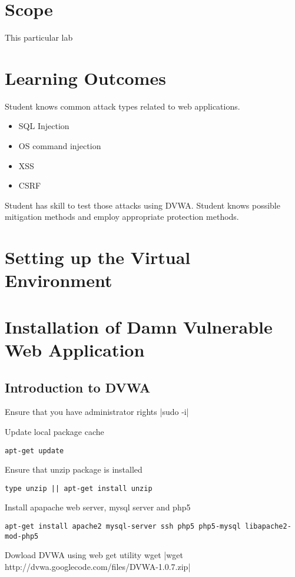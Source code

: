 \section{Scope}
This particular lab 
\section{Learning Outcomes}
Student knows common attack types related to web applications.
\begin{itemize}
	\item SQL Injection
	\item OS command injection
	\item  \gls{XSS}
	\item  \gls{CSRF}
\end{itemize} Student has skill to test those attacks using \gls{DVWA}.
Student knows possible mitigation methods and employ appropriate protection methods.
\section{Setting up the Virtual Environment}
\section{Installation of Damn Vulnerable Web Application}
\subsection{Introduction to DVWA}

Ensure that you have administrator rights
|sudo -i|

Update local package cache
\begin{verbatim}
apt-get update
\end{verbatim}


Ensure that unzip package is installed
\begin{verbatim}
type unzip || apt-get install unzip
\end{verbatim}

Install apapache web server, mysql server and php5
\begin{verbatim}
apt-get install apache2 mysql-server ssh php5 php5-mysql libapache2-mod-php5
\end{verbatim}


Dowload DVWA using web get utility wget
|wget http://dvwa.googlecode.com/files/DVWA-1.0.7.zip|

